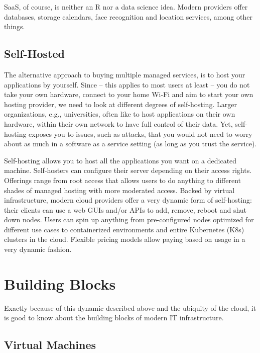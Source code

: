 \documentclass[
  12pt,
  letterpaper,
]{krantz}
\begin{document}
SaaS, of course, is neither an R nor a data science idea. Modern
providers offer databases, storage calendars, face
recognition and location services, among other things.

\hypertarget{self-hosted}{%
\subsection{Self-Hosted}\label{self-hosted}}

The alternative approach to buying multiple managed services, is to host
your applications by yourself. Since -- this applies to most users at
least -- you do not take your own hardware, connect to your home Wi-Fi
and aim to start your own hosting provider, we need to look at different
degrees of self-hosting. Larger organizations, e.g., universities, often
like to host applications on their own hardware, within their own
network to have full control of their data. Yet, self-hosting exposes
you to issues, such as attacks, that you would not need to worry about
as much in a software as a service setting (as long as you trust the
service).

Self-hosting allows you to host all the applications you want on a
dedicated machine. Self-hosters can configure their server depending on
their access rights. Offerings range from root access that allows users
to do anything to different shades of managed hosting with more
moderated access. Backed by virtual
infrastructure, modern cloud providers offer a
very dynamic form of self-hosting: their clients can use a web GUIs
and/or APIs to add, remove, reboot and shut down nodes. Users can spin
up anything from pre-configured nodes optimized for different use cases
to containerized environments and entire Kubernetes (K8s) clusters in
the cloud. Flexible pricing models allow paying based on usage in a very
dynamic fashion.

\hypertarget{building-blocks}{%
\section{Building Blocks}\label{building-blocks}}

Exactly because of this dynamic described above and the ubiquity of the
cloud, it is good to know about the building blocks of modern IT
infrastructure.

\hypertarget{virtual-machines}{%
\subsection{Virtual Machines}\label{virtual-machines}}
\end{document}
